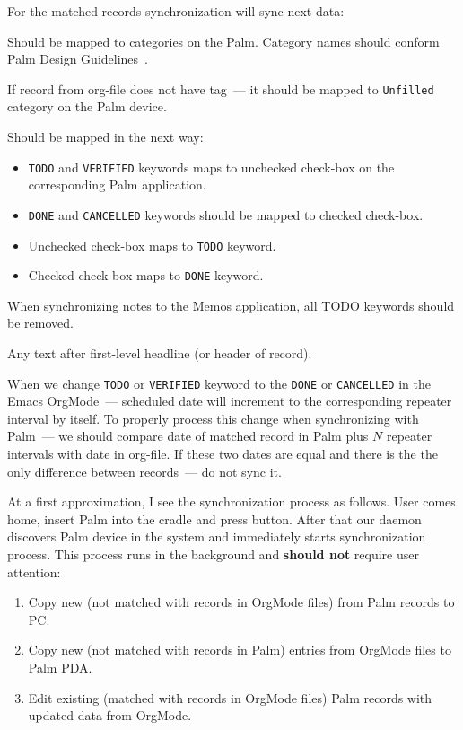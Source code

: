 \documentclass[a4paper,12pt,oneside]{scrartcl}
\begin{document}
For the matched records synchronization will sync next data:
\begin{description}
\item[tags] Should be mapped to categories on the Palm. Category names should
  conform Palm Design Guidelines~\cite{PalmDesignGuide}.

  If record from org-file does not have tag~--- it should be mapped to
  \texttt{Unfilled} category on the Palm device.
\item[TODO keywords] Should be mapped in the next way:
  \begin{itemize}
  \item \texttt{TODO} and \texttt{VERIFIED} keywords maps to unchecked check-box
    on the corresponding Palm application.
  \item \texttt{DONE} and \texttt{CANCELLED} keywords should be mapped to
    checked check-box.
  \item Unchecked check-box maps to \texttt{TODO} keyword.
  \item Checked check-box maps to \texttt{DONE} keyword.
  \end{itemize}

  When synchronizing notes to the Memos application, all TODO keywords should be
  removed.
\item Any text after first-level headline (or header of record).
\end{description}

When we change \texttt{TODO} or \texttt{VERIFIED} keyword to the \texttt{DONE}
or \texttt{CANCELLED} in the Emacs OrgMode~--- scheduled date will increment to
the corresponding repeater interval by itself. To properly process this change
when synchronizing with Palm~--- we should compare date of matched record in
Palm plus $N$ repeater intervals with date in org-file. If these two dates are
equal and there is the the only difference between records~--- do not sync it.

At a first approximation, I see the synchronization process as follows. User
comes home, insert Palm into the cradle and press button. After that our daemon
discovers Palm device in the system and immediately starts synchronization
process. This process runs in the background and \textbf{should not} require
user attention:

\begin{enumerate}
\item Copy new (not matched with records in OrgMode files) from Palm records to
  PC.
\item Copy new (not matched with records in Palm) entries from OrgMode files to
  Palm PDA.
\item Edit existing (matched with records in OrgMode files) Palm records with
  updated data from OrgMode.
\end{enumerate}
\end{document}
